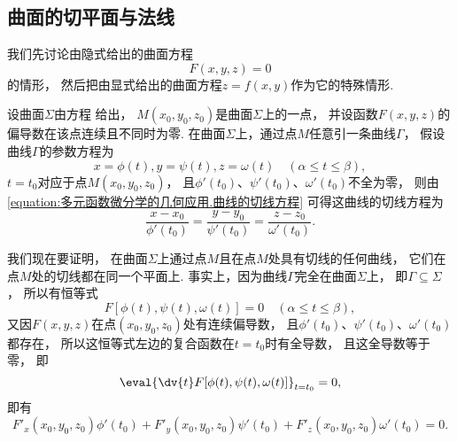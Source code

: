 \subsection{曲面的切平面与法线}
我们先讨论由隐式给出的曲面方程 
\begin{equation*}
	F(x,y,z) = 0
\end{equation*}的情形，
然后把由显式给出的曲面方程\(z = f(x,y)\)作为它的特殊情形.

设曲面\(\Sigma\)由方程  给出，
\(M(x_0,y_0,z_0)\)是曲面\(\Sigma\)上的一点，
并设函数\(F(x,y,z)\)的偏导数在该点连续且不同时为零.
在曲面\(\Sigma\)上，通过点\(M\)任意引一条曲线\(\Gamma\)，
假设曲线\(\Gamma\)的参数方程为
\begin{equation}\label{equation:多元函数微分学的几何应用.曲面上的曲线.中间步骤1}
	x = \phi(t),
	y = \psi(t),
	z = \omega(t)
	\quad (\alpha \leq t \leq \beta),
\end{equation}
\(t = t_0\)对应于点\(M(x_0,y_0,z_0)\)，
且\(\phi'(t_0)\)、\(\psi'(t_0)\)、\(\omega'(t_0)\)不全为零，
则由\cref{equation:多元函数微分学的几何应用.曲线的切线方程}
可得这曲线的切线方程为\begin{equation*}
	\frac{x-x_0}{\phi'(t_0)}
	=\frac{y-y_0}{\psi'(t_0)}
	=\frac{z-z_0}{\omega'(t_0)}.
\end{equation*}

我们现在要证明，
在曲面\(\Sigma\)上通过点\(M\)且在点\(M\)处具有切线的任何曲线，
它们在点\(M\)处的切线都在同一个平面上.
事实上，因为曲线\(\Gamma\)完全在曲面\(\Sigma\)上，
即\(\Gamma \subseteq \Sigma\)，
所以有恒等式\begin{equation*}
	F[\phi(t),\psi(t),\omega(t)] = 0
	\quad(\alpha \leq t \leq \beta),
\end{equation*}
又因\(F(x,y,z)\)在点\((x_0,y_0,z_0)\)处有连续偏导数，
且\(\phi'(t_0)\)、\(\psi'(t_0)\)、\(\omega'(t_0)\)都存在，
所以这恒等式左边的复合函数在\(t = t_0\)时有全导数，
且这全导数等于零，
即\begin{equation*}
	\eval{\dv{t} F[\phi(t),\psi(t),\omega(t)]}_{t=t_0} = 0,
\end{equation*}
即有\begin{equation}\label{equation:多元函数微分学的几何应用.曲面上的曲线.中间步骤2}
	F'_x(x_0,y_0,z_0) \phi'(t_0)
	+ F'_y(x_0,y_0,z_0) \psi'(t_0)
	+ F'_z(x_0,y_0,z_0) \omega'(t_0)
	= 0.
\end{equation}

